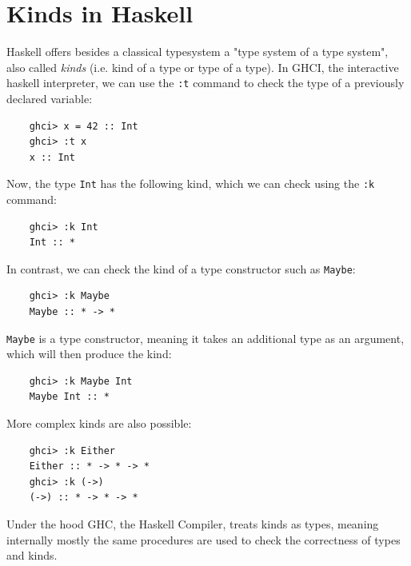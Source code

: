 \documentclass[12pt,oneside,a4paper]{article}
\begin{document}
\section{Kinds in Haskell}
Haskell offers besides a classical typesystem a "type system of a type system", also called \textit{kinds} (i.e. kind of a type or type of a type). In GHCI, the interactive haskell interpreter, we can use the \texttt{:t} command to check the type of a previously declared variable:
\begin{lstlisting}
    ghci> x = 42 :: Int
    ghci> :t x
    x :: Int
\end{lstlisting}
Now, the type \texttt{Int} has the following kind, which we can check using the \texttt{:k} command:
\begin{lstlisting}
    ghci> :k Int
    Int :: *
\end{lstlisting}
In contrast, we can check the kind of a type constructor such as \texttt{Maybe}:
\begin{lstlisting}
    ghci> :k Maybe
    Maybe :: * -> *
\end{lstlisting}
\texttt{Maybe} is a type constructor, meaning it takes an additional type as an argument, which will then produce the kind:
\begin{lstlisting}
    ghci> :k Maybe Int
    Maybe Int :: *
\end{lstlisting}
More complex kinds are also possible:
\begin{lstlisting}
    ghci> :k Either
    Either :: * -> * -> *
    ghci> :k (->)
    (->) :: * -> * -> *
\end{lstlisting}
Under the hood GHC, the Haskell Compiler, treats kinds as types, meaning internally mostly the same procedures are used to check the correctness of types and kinds.
\end{document}
